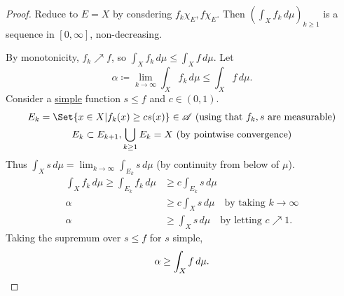 \documentclass[twoside]{article}
\begin{document}
\begin{proof}
    Reduce to $E = X$ by consdering $f_k \chi_E, f \chi_E$.
    Then $\left(\int_X f_k \, d\mu\right)_{k \geq 1}$ is a sequence in $[0, \infty]$, non-decreasing.

    By monotonicity, $f_k \nearrow f$, so $\int_X f_k \, d\mu \leq \int_X f \, d\mu$.
    Let
    \begin{equation*}
        \alpha \coloneqq \lim_{k \to \infty} \int_X f_k \, d\mu \leq \int_X f \, d\mu.
    \end{equation*}
    Consider a \hyperlink{def:simple}{simple} function $s \leq f$ and $c \in (0, 1)$.
    \begin{gather*}
        E_k = \Set{x\in X | f_k(x) \geq c s(x)} \in \mathscr{A} \text{ (using that $f_k, s$ are measurable)}\\
        E_k \subset E_{k+1}, \bigcup_{k \geq 1} E_k = X \text{ (by pointwise convergence)}
    \end{gather*}
    Thus $\int_X s \, d\mu = \lim_{k \to \infty} \int_{E_k} s \, d\mu$ (by continuity from below of $\mu$).
    \begin{align*}
        \int_X f_k \, d\mu \geq \int_{E_k} f_k \, d \mu &\geq c \int_{E_k} s \, d \mu \\
        \alpha &\geq c \int_X s \, d \mu \quad \text{by taking } k \to \infty \\
        \alpha &\geq \int_X s \, d \mu \quad \text{by letting } c \nearrow 1.
    \end{align*}
    Taking the supremum over $s \leq f$ for $s$ simple,
    \begin{equation*}
        \alpha \geq \int_X f \, d\mu.\qedhere
    \end{equation*}
\end{proof}
\end{document}
